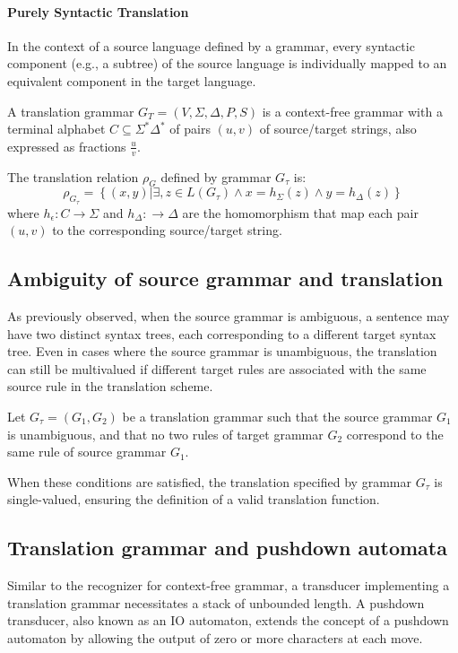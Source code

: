 \paragraph*{Purely Syntactic Translation}
In the context of a source language defined by a grammar, every syntactic component (e.g., a subtree) of the source language is individually mapped to an equivalent component in the target language.
\begin{definition}
    A translation grammar $G_T = \left( V, \Sigma, \Delta, P, S \right)$ is a context-free grammar with a terminal alphabet $C \subseteq \Sigma^{*} \Delta^{*}$ of pairs $\left( u, v \right)$ of source/target strings, also expressed as fractions $\frac{u}{v}$.
\end{definition}
\begin{definition}
    The translation relation $\rho_G$ defined by grammar $G_\tau$ is:
    \[ \rho_{G_\tau}  = \left\{ \left( x, y \right) | \exists , z \in L\left( G_\tau \right) \land x = h_\Sigma \left( z \right) \land y = h_\Delta \left( z \right) \right\} \]
    where $h_\epsilon : C \rightarrow \Sigma$ and $h_\Delta : \rightarrow \Delta$ are the homomorphism that map each pair $\left( u, v \right)$ to the corresponding source/target string.
\end{definition}

\subsection{Ambiguity of source grammar and translation}
As previously observed, when the source grammar is ambiguous, a sentence may have two distinct syntax trees, each corresponding to a different target syntax tree. 
Even in cases where the source grammar is unambiguous, the translation can still be multivalued if different target rules are associated with the same source rule in the translation scheme.
\begin{property}
    Let $G_\tau = \left( G_1, G_2 \right)$ be a translation grammar such that the source grammar $G_1$ is unambiguous, and that no two rules of target grammar $G_2$ correspond to the same rule of source grammar $G_1$.
\end{property}
When these conditions are satisfied, the translation specified by grammar $G_\tau$ is single-valued, ensuring the definition of a valid translation function.

\subsection{Translation grammar and pushdown automata}
Similar to the recognizer for context-free grammar, a transducer implementing a translation grammar necessitates a stack of unbounded length.
A pushdown transducer, also known as an IO automaton, extends the concept of a pushdown automaton by allowing the output of zero or more characters at each move.

